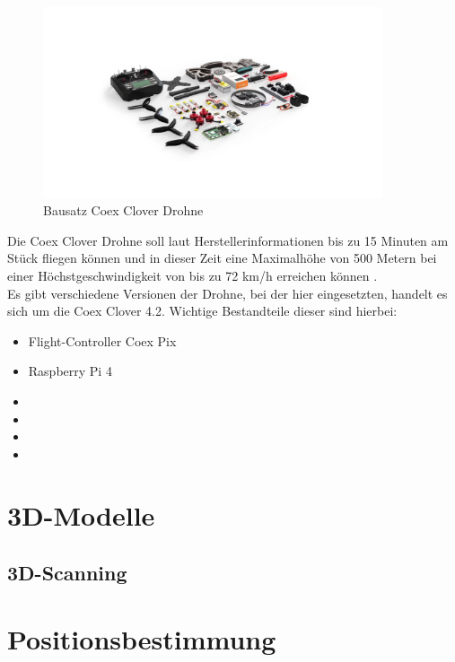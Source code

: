\begin{figure}[htpb]
    \centering
    \includegraphics[width=10cm,keepaspectratio,angle=0]{images/coex_clover_kit.jpg}
    \caption[Bausatz Coex Clover Drohne]{\label{img coex_clover_kit} Bausatz Coex Clover Drohne \cite{img_coex_clover_kit}}
\end{figure}

Die Coex Clover Drohne soll laut Herstellerinformationen bis zu 15 Minuten am Stück fliegen können und in dieser Zeit eine Maximalhöhe von 500 Metern bei einer Höchstgeschwindigkeit von bis zu 72 km/h erreichen können \cite[vgl.][]{coex_clover}.\\

Es gibt verschiedene Versionen der Drohne, bei der hier eingesetzten, handelt es sich um die Coex Clover 4.2.
Wichtige Bestandteile dieser sind hierbei:
\begin{center}
    \begin{itemize}
        \item Flight-Controller Coex Pix
        \item Raspberry Pi 4
        \item 
        \item 
        \item 
        \item 
    \end{itemize}
    \label{lst:coex-components}
\end{center}



\section{3D-Modelle}

    \subsection{3D-Scanning}

\section{Positionsbestimmung}

